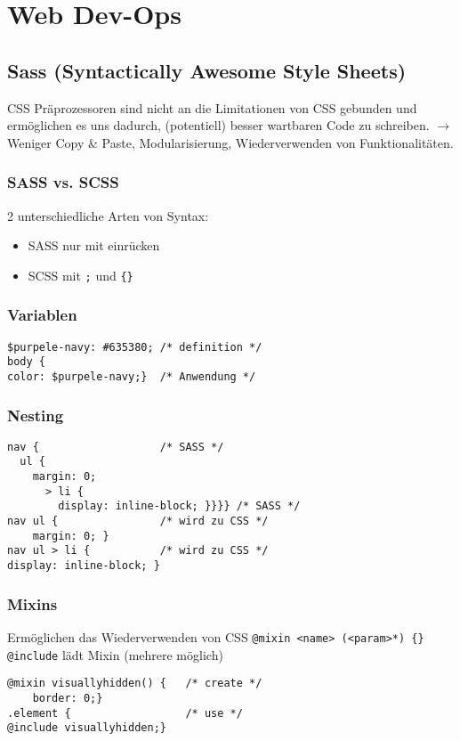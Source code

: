 
\section{Web Dev-Ops}


\subsection{Sass (Syntactically Awesome Style Sheets)}
CSS Präprozessoren sind nicht an die Limitationen von CSS gebunden und ermöglichen es uns dadurch, (potentiell) besser wartbaren Code zu schreiben. $\rightarrow$  Weniger Copy \& Paste, Modularisierung, Wiederverwenden von Funktionalitäten.

\subsubsection{SASS vs. SCSS}
2 unterschiedliche Arten von Syntax:
\begin{itemize}
    \item SASS nur mit einrücken
    \item SCSS mit \texttt{;} und \texttt{\{\}}
\end{itemize}

\subsubsection{Variablen}
\begin{lstlisting}
$purpele-navy: #635380; /* definition */
body {
color: $purpele-navy;}  /* Anwendung */
\end{lstlisting}

\subsubsection{Nesting}
\begin{lstlisting}
nav {                   /* SASS */
  ul {
    margin: 0;
      > li {
        display: inline-block; }}}} /* SASS */
nav ul {                /* wird zu CSS */
    margin: 0; }
nav ul > li {           /* wird zu CSS */
display: inline-block; }
\end{lstlisting}

\subsubsection{Mixins}
Ermöglichen das Wiederverwenden von CSS
\texttt{@mixin <name> (<param>*) \{<scss snippet>\}}
\texttt{@include} lädt Mixin (mehrere möglich)
\begin{lstlisting}
@mixin visuallyhidden() {   /* create */
    border: 0;}
.element {                  /* use */
@include visuallyhidden;}
\end{lstlisting}

